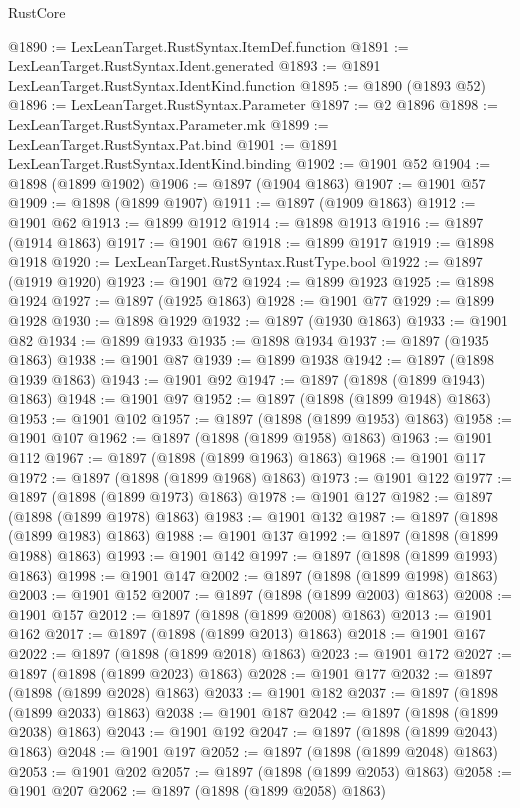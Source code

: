 \begin{lexlean}{RustCore}
\begin{coremodule}
@1890 := LexLeanTarget.RustSyntax.ItemDef.function
@1891 := LexLeanTarget.RustSyntax.Ident.generated
@1893 := @1891 LexLeanTarget.RustSyntax.IdentKind.function
@1895 := @1890 (@1893 @52)
@1896 := LexLeanTarget.RustSyntax.Parameter
@1897 := @2 @1896
@1898 := LexLeanTarget.RustSyntax.Parameter.mk
@1899 := LexLeanTarget.RustSyntax.Pat.bind
@1901 := @1891 LexLeanTarget.RustSyntax.IdentKind.binding
@1902 := @1901 @52
@1904 := @1898 (@1899 @1902)
@1906 := @1897 (@1904 @1863)
@1907 := @1901 @57
@1909 := @1898 (@1899 @1907)
@1911 := @1897 (@1909 @1863)
@1912 := @1901 @62
@1913 := @1899 @1912
@1914 := @1898 @1913
@1916 := @1897 (@1914 @1863)
@1917 := @1901 @67
@1918 := @1899 @1917
@1919 := @1898 @1918
@1920 := LexLeanTarget.RustSyntax.RustType.bool
@1922 := @1897 (@1919 @1920)
@1923 := @1901 @72
@1924 := @1899 @1923
@1925 := @1898 @1924
@1927 := @1897 (@1925 @1863)
@1928 := @1901 @77
@1929 := @1899 @1928
@1930 := @1898 @1929
@1932 := @1897 (@1930 @1863)
@1933 := @1901 @82
@1934 := @1899 @1933
@1935 := @1898 @1934
@1937 := @1897 (@1935 @1863)
@1938 := @1901 @87
@1939 := @1899 @1938
@1942 := @1897 (@1898 @1939 @1863)
@1943 := @1901 @92
@1947 := @1897 (@1898 (@1899 @1943) @1863)
@1948 := @1901 @97
@1952 := @1897 (@1898 (@1899 @1948) @1863)
@1953 := @1901 @102
@1957 := @1897 (@1898 (@1899 @1953) @1863)
@1958 := @1901 @107
@1962 := @1897 (@1898 (@1899 @1958) @1863)
@1963 := @1901 @112
@1967 := @1897 (@1898 (@1899 @1963) @1863)
@1968 := @1901 @117
@1972 := @1897 (@1898 (@1899 @1968) @1863)
@1973 := @1901 @122
@1977 := @1897 (@1898 (@1899 @1973) @1863)
@1978 := @1901 @127
@1982 := @1897 (@1898 (@1899 @1978) @1863)
@1983 := @1901 @132
@1987 := @1897 (@1898 (@1899 @1983) @1863)
@1988 := @1901 @137
@1992 := @1897 (@1898 (@1899 @1988) @1863)
@1993 := @1901 @142
@1997 := @1897 (@1898 (@1899 @1993) @1863)
@1998 := @1901 @147
@2002 := @1897 (@1898 (@1899 @1998) @1863)
@2003 := @1901 @152
@2007 := @1897 (@1898 (@1899 @2003) @1863)
@2008 := @1901 @157
@2012 := @1897 (@1898 (@1899 @2008) @1863)
@2013 := @1901 @162
@2017 := @1897 (@1898 (@1899 @2013) @1863)
@2018 := @1901 @167
@2022 := @1897 (@1898 (@1899 @2018) @1863)
@2023 := @1901 @172
@2027 := @1897 (@1898 (@1899 @2023) @1863)
@2028 := @1901 @177
@2032 := @1897 (@1898 (@1899 @2028) @1863)
@2033 := @1901 @182
@2037 := @1897 (@1898 (@1899 @2033) @1863)
@2038 := @1901 @187
@2042 := @1897 (@1898 (@1899 @2038) @1863)
@2043 := @1901 @192
@2047 := @1897 (@1898 (@1899 @2043) @1863)
@2048 := @1901 @197
@2052 := @1897 (@1898 (@1899 @2048) @1863)
@2053 := @1901 @202
@2057 := @1897 (@1898 (@1899 @2053) @1863)
@2058 := @1901 @207
@2062 := @1897 (@1898 (@1899 @2058) @1863)

\end{coremodule}
\end{lexlean}
